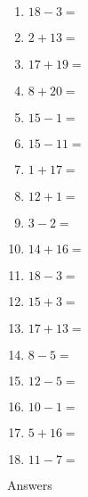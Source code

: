 \documentclass[11pt]{article}\usepackage[a4paper,margin=0.90in,tmargin=0.5in]{geometry}\usepackage{amsmath, amsthm, amssymb}
\begin{document}
\begin{multicols}{4}
\begin{enumerate}[itemsep=0.45\baselineskip]
\item $18 - 3 =$ 
\item $2 + 13 =$ 
\item $17 + 19 =$ 
\item $8 + 20 =$ 
\item $15 - 1 =$ 
\item $15 - 11 =$ 
\item $1 + 17 =$ 
\item $12 + 1 =$ 
\item $3 - 2 =$ 
\item $14 + 16 =$ 
\item $18 - 3 =$ 
\item $15 + 3 =$ 
\item $17 + 13 =$ 
\item $8 - 5 =$ 
\item $12 - 5 =$ 
\item $10 - 1 =$ 
\item $5 + 16 =$ 
\item $11 - 7 =$ 
\end{enumerate}
\end{multicols}
\newpage\vspace{\baselineskip}
\begin{center}
{\Huge Answers}
\end{center}
\end{document}
